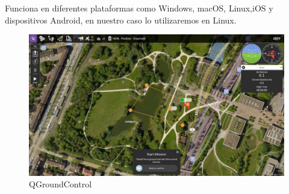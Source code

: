 Funciona en diferentes plataformas como Windows, macOS, Linux,iOS y dispositivos Android, en nuestro caso lo utilizaremos en Linux. 

\begin{figure} [h]
  \begin{center}
    \includegraphics[scale=1.2]{figs/Plataformas_Desarollo/software-qgc.jpg}
  \end{center}
  \caption{QGroundControl}
  \label{fig:QGroundControl}
\end{figure}\


































